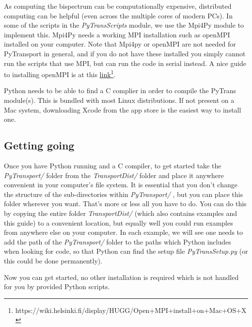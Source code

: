\documentclass[10pt,
amsmath,amssymb,
aps,prd,nofootinbib,eqsecnum,a4paper]{revtex4}
\newcommand{\CC}{C\nolinebreak\hspace{-.05em}\raisebox{.4ex}{\tiny\bf +}\nolinebreak\hspace{-.10em}\raisebox{.4ex}{\tiny\bf +}}
\def\CC{{C\nolinebreak[4]\hspace{-.05em}\raisebox{.4ex}{\tiny\bf ++}}}
\def\S{ }
\begin{document}
\vspace{0.2cm}
As computing the bispectrum can be computationally expensive, distributed computing can be helpful 
(even across the multiple cores of modern PCs). 
In some of the scripts in the 
{\it PyTransScripts} module,  
we use the Mpi4Py module to implement this. Mpi4Py needs a working MPI installation such as 
openMPI installed on your 
computer. Note that Mpi4py or openMPI are not needed for 
PyTransport in general, and if you do not have these installed you simply  
cannot run the scripts that use MPI, but can run the code in serial instead. A nice guide to installing openMPI is 
at this \href{https://wiki.helsinki.fi/display/HUGG/Open+MPI+install+on+Mac+OS+X}{link}\footnote{https://wiki.helsinki.fi/display/HUGG/Open+MPI+install+on+Mac+OS+X}.

\vspace{0.2cm}
\noindent {\bf \CC \S  complier}
Python needs to be able to find a \CC \S  complier in order to compile the PyTrans module(s). This is bundled with most 
Linux distributions. If not present on a Mac system, downloading Xcode from the app store is the easiest way to 
install one.

\subsection{Getting going}

\noindent  Once you have Python running and a \CC \S compiler, to get started take the {\it PyTransport/} folder from the 
{\it TransportDist/} folder and place it 
anywhere convenient in your computer's file system. It is essential that you don't change 
the structure of the sub-directories within {\it PyTransport/} , but you can place this folder wherever you want.  
That's more or less all you have to do.
You can do this by copying the entire folder {\it TransportDist/} (which 
also contains examples and this guide) to a convenient location, but equally well you could run examples from 
anywhere else on your computer. In each example, we will see one needs to add the path of  
the {\it PyTransport/} folder to the paths which Python includes when looking for code, so that Python can 
find the setup file 
{\it PyTransSetup.py} (or this could be done permanently).

Now you can get started, no other installation is required which is not handled for you by provided 
Python scripts.
\end{document}
